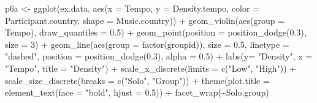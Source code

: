 \documentclass[
  bookmarksnumbered]{article}
\newenvironment{Shaded}{\begin{snugshade}}{\end{snugshade}}
\newcommand{\AttributeTok}[1]{\textcolor[rgb]{0.80,0.80,0.80}{#1}}
\newcommand{\DecValTok}[1]{\textcolor[rgb]{0.86,0.86,0.80}{#1}}
\newcommand{\FloatTok}[1]{\textcolor[rgb]{0.75,0.75,0.82}{#1}}
\newcommand{\FunctionTok}[1]{\textcolor[rgb]{0.94,0.94,0.56}{#1}}
\newcommand{\NormalTok}[1]{\textcolor[rgb]{0.80,0.80,0.80}{#1}}
\newcommand{\OtherTok}[1]{\textcolor[rgb]{0.94,0.94,0.56}{#1}}
\newcommand{\SpecialCharTok}[1]{\textcolor[rgb]{0.86,0.64,0.64}{#1}}
\newcommand{\StringTok}[1]{\textcolor[rgb]{0.80,0.58,0.58}{#1}}
\begin{document}
\begin{Shaded}
\begin{Highlighting}[]
\NormalTok{p6a }\OtherTok{\textless{}{-}} \FunctionTok{ggplot}\NormalTok{(ex.data, }\FunctionTok{aes}\NormalTok{(}\AttributeTok{x =}\NormalTok{ Tempo, }\AttributeTok{y =}\NormalTok{ Density.tempo, }\AttributeTok{color =}\NormalTok{ Participant.country, }\AttributeTok{shape =}\NormalTok{ Music.country)) }\SpecialCharTok{+}
  \FunctionTok{geom\_violin}\NormalTok{(}\FunctionTok{aes}\NormalTok{(}\AttributeTok{group =}\NormalTok{ Tempo), }\AttributeTok{draw\_quantiles =} \FloatTok{0.5}\NormalTok{) }\SpecialCharTok{+}
  \FunctionTok{geom\_point}\NormalTok{(}\AttributeTok{position =} \FunctionTok{position\_dodge}\NormalTok{(}\FloatTok{0.3}\NormalTok{), }\AttributeTok{size =} \DecValTok{3}\NormalTok{) }\SpecialCharTok{+}
  \FunctionTok{geom\_line}\NormalTok{(}\FunctionTok{aes}\NormalTok{(}\AttributeTok{group =} \FunctionTok{factor}\NormalTok{(groupid)), }\AttributeTok{size =} \FloatTok{0.5}\NormalTok{, }\AttributeTok{linetype =} \StringTok{"dashed"}\NormalTok{, }\AttributeTok{position =} \FunctionTok{position\_dodge}\NormalTok{(}\FloatTok{0.3}\NormalTok{), }\AttributeTok{alpha =} \FloatTok{0.5}\NormalTok{) }\SpecialCharTok{+}
  \FunctionTok{labs}\NormalTok{(}\AttributeTok{y=} \StringTok{"Density"}\NormalTok{, }\AttributeTok{x =} \StringTok{"Tempo"}\NormalTok{, }\AttributeTok{title =} \StringTok{"Density"}\NormalTok{) }\SpecialCharTok{+}
  \FunctionTok{scale\_x\_discrete}\NormalTok{(}\AttributeTok{limits =} \FunctionTok{c}\NormalTok{(}\StringTok{"Low"}\NormalTok{, }\StringTok{"High"}\NormalTok{)) }\SpecialCharTok{+} 
  \FunctionTok{scale\_size\_discrete}\NormalTok{(}\AttributeTok{breaks =} \FunctionTok{c}\NormalTok{(}\StringTok{"Solo"}\NormalTok{, }\StringTok{"Group"}\NormalTok{)) }\SpecialCharTok{+} 
  \FunctionTok{theme}\NormalTok{(}\AttributeTok{plot.title =} \FunctionTok{element\_text}\NormalTok{(}\AttributeTok{face =} \StringTok{"bold"}\NormalTok{, }\AttributeTok{hjust =} \FloatTok{0.5}\NormalTok{)) }\SpecialCharTok{+} 
  \FunctionTok{facet\_wrap}\NormalTok{(}\SpecialCharTok{\textasciitilde{}}\NormalTok{Solo.group)}


\end{Highlighting}
\end{Shaded}
\end{document}
